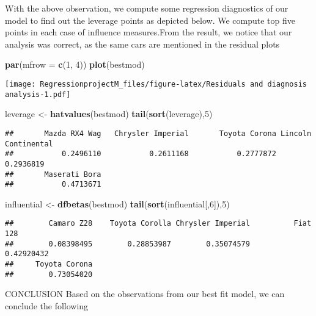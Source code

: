 \documentclass[
]{article}
\newenvironment{Shaded}{\begin{snugshade}}{\end{snugshade}}
\newcommand{\DataTypeTok}[1]{\textcolor[rgb]{0.13,0.29,0.53}{#1}}
\newcommand{\DecValTok}[1]{\textcolor[rgb]{0.00,0.00,0.81}{#1}}
\newcommand{\KeywordTok}[1]{\textcolor[rgb]{0.13,0.29,0.53}{\textbf{#1}}}
\newcommand{\NormalTok}[1]{#1}
\newcommand{\StringTok}[1]{\textcolor[rgb]{0.31,0.60,0.02}{#1}}
\begin{document}
With the above observation, we compute some regression diagnostics of
our model to find out the leverage points as depicted below. We compute
top five points in each case of influence measures.From the result, we
notice that our analysis was correct, as the same cars are mentioned in
the residual plots

\begin{Shaded}
\begin{Highlighting}[]
\KeywordTok{par}\NormalTok{(}\DataTypeTok{mfrow =} \KeywordTok{c}\NormalTok{(}\DecValTok{1}\NormalTok{, }\DecValTok{4}\NormalTok{))}
\KeywordTok{plot}\NormalTok{(bestmod)}
\end{Highlighting}
\end{Shaded}

\texttt{[image: RegressionprojectM\_files/figure-latex/Residuals and diagnosis analysis-1.pdf]}

\begin{Shaded}
\begin{Highlighting}[]
\NormalTok{leverage <-}\StringTok{ }\KeywordTok{hatvalues}\NormalTok{(bestmod)}
\KeywordTok{tail}\NormalTok{(}\KeywordTok{sort}\NormalTok{(leverage),}\DecValTok{5}\NormalTok{)}
\end{Highlighting}
\end{Shaded}

\begin{verbatim}
##       Mazda RX4 Wag   Chrysler Imperial       Toyota Corona Lincoln Continental 
##           0.2496110           0.2611168           0.2777872           0.2936819 
##       Maserati Bora 
##           0.4713671
\end{verbatim}

\begin{Shaded}
\begin{Highlighting}[]
\NormalTok{influential <-}\StringTok{ }\KeywordTok{dfbetas}\NormalTok{(bestmod)}
\KeywordTok{tail}\NormalTok{(}\KeywordTok{sort}\NormalTok{(influential[,}\DecValTok{6}\NormalTok{]),}\DecValTok{5}\NormalTok{)}
\end{Highlighting}
\end{Shaded}

\begin{verbatim}
##        Camaro Z28    Toyota Corolla Chrysler Imperial          Fiat 128 
##        0.08398495        0.28853987        0.35074579        0.42920432 
##     Toyota Corona 
##        0.73054020
\end{verbatim}

CONCLUSION Based on the observations from our best fit model, we can
conclude the following
\end{document}

